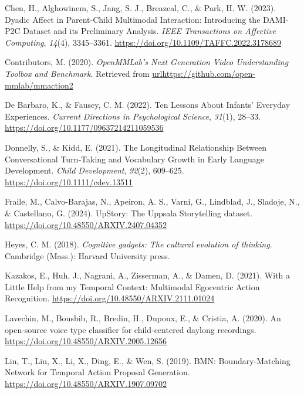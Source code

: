 \documentclass[
  man,floatsintext]{apa6}
\newlength{\cslhangindent}
\newenvironment{CSLReferences}[2] %
 {\begin{list}{}{%
  \setlength{\itemindent}{0pt}
  \setlength{\leftmargin}{0pt}
  \setlength{\parsep}{0pt}
  \ifodd #1
   \setlength{\leftmargin}{\cslhangindent}
   \setlength{\itemindent}{-1\cslhangindent}
  \fi
  \setlength{\itemsep}{#2\baselineskip}}}
 {\end{list}}
\begin{document}
\begin{CSLReferences}{1}{0}
Chen, H., Alghowinem, S., Jang, S. J., Breazeal, C., \& Park, H. W. (2023). Dyadic {Affect} in {Parent-Child Multimodal Interaction}: {Introducing} the {DAMI-P2C Dataset} and its {Preliminary Analysis}. \emph{IEEE Transactions on Affective Computing}, \emph{14}(4), 3345--3361. \url{https://doi.org/10.1109/TAFFC.2022.3178689}

Contributors, M. (2020). \emph{{OpenMMLab}'s {Next Generation Video Understanding Toolbox} and {Benchmark}}. Retrieved from \url{urlhttps://github.com/open-mmlab/mmaction2}

De Barbaro, K., \& Fausey, C. M. (2022). Ten {Lessons About Infants}' {Everyday Experiences}. \emph{Current Directions in Psychological Science}, \emph{31}(1), 28--33. \url{https://doi.org/10.1177/09637214211059536}

Donnelly, S., \& Kidd, E. (2021). The {Longitudinal Relationship Between Conversational Turn}‐{Taking} and {Vocabulary Growth} in {Early Language Development}. \emph{Child Development}, \emph{92}(2), 609--625. \url{https://doi.org/10.1111/cdev.13511}

Fraile, M., Calvo-Barajas, N., Apeiron, A. S., Varni, G., Lindblad, J., Sladoje, N., \& Castellano, G. (2024). {UpStory}: The {Uppsala Storytelling} dataset. \url{https://doi.org/10.48550/ARXIV.2407.04352}

Heyes, C. M. (2018). \emph{Cognitive gadgets: The cultural evolution of thinking}. Cambridge (Mass.): Harvard University press.

Kazakos, E., Huh, J., Nagrani, A., Zisserman, A., \& Damen, D. (2021). With a {Little Help} from my {Temporal Context}: {Multimodal Egocentric Action Recognition}. \url{https://doi.org/10.48550/ARXIV.2111.01024}

Lavechin, M., Bousbib, R., Bredin, H., Dupoux, E., \& Cristia, A. (2020). An open-source voice type classifier for child-centered daylong recordings. \url{https://doi.org/10.48550/ARXIV.2005.12656}

Lin, T., Liu, X., Li, X., Ding, E., \& Wen, S. (2019). {BMN}: {Boundary-Matching Network} for {Temporal Action Proposal Generation}. \url{https://doi.org/10.48550/ARXIV.1907.09702}


\end{CSLReferences}
\end{document}
